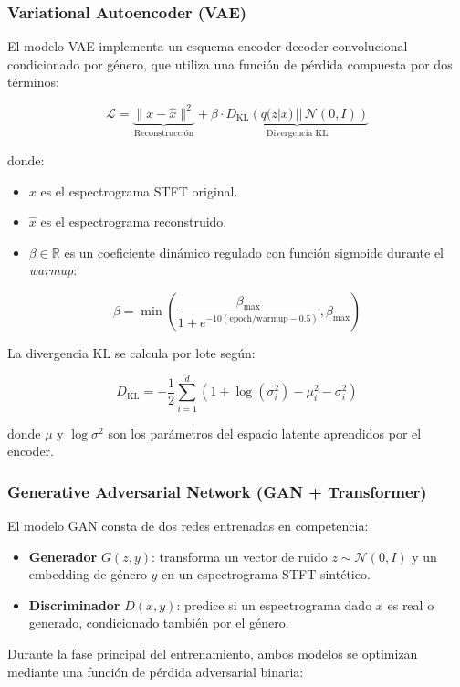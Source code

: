 \subsubsection*{Variational Autoencoder (VAE)}

El modelo VAE implementa un esquema encoder-decoder convolucional condicionado por género, que utiliza una función de pérdida compuesta por dos términos:

\[
\mathcal{L} = \underbrace{\|x - \hat{x}\|^2}_{\text{Reconstrucción}} + \beta \cdot \underbrace{D_{\text{KL}}\left(q(z|x) \,||\, \mathcal{N}(0, I)\right)}_{\text{Divergencia KL}}
\]

donde:
\begin{itemize}
    \item $x$ es el espectrograma STFT original.
    \item $\hat{x}$ es el espectrograma reconstruido.
    \item $\beta \in \mathbb{R}$ es un coeficiente dinámico regulado con función sigmoide durante el \textit{warmup}:
\end{itemize}

\[
\beta = \min\left( \frac{\beta_{\max}}{1 + e^{-10 (\text{epoch} / \text{warmup} - 0.5)}}, \beta_{\max} \right)
\]

La divergencia KL se calcula por lote según:

\[
D_{\text{KL}} = -\frac{1}{2} \sum_{i=1}^{d} \left(1 + \log(\sigma_i^2) - \mu_i^2 - \sigma_i^2\right)
\]

donde $\mu$ y $\log\sigma^2$ son los parámetros del espacio latente aprendidos por el encoder.

\subsubsection*{Generative Adversarial Network (GAN + Transformer)}

El modelo GAN consta de dos redes entrenadas en competencia:

\begin{itemize}
    \item \textbf{Generador} $G(z, y)$: transforma un vector de ruido $z \sim \mathcal{N}(0, I)$ y un embedding de género $y$ en un espectrograma STFT sintético.
    \item \textbf{Discriminador} $D(x, y)$: predice si un espectrograma dado $x$ es real o generado, condicionado también por el género.
\end{itemize}

Durante la fase principal del entrenamiento, ambos modelos se optimizan mediante una función de pérdida adversarial binaria:

